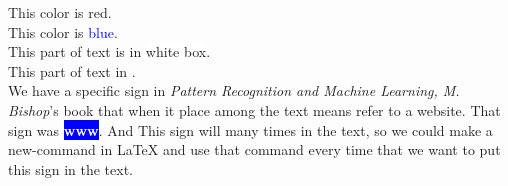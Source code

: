 \documentclass[12pt]{article}
\begin{document}
	
	\noindent
	This color is {\color{red} red}.\\
	
	\noindent
	This color is \textcolor{blue}{blue}.\\
	
	\noindent
	This part of text is in \colorbox{white}{white box}.\\
	
	\noindent
	This part of text in .\\
	
	\noindent
	We have a specific sign in \emph{Pattern Recognition and Machine Learning, M. Bishop}'s book that when it place among the text means refer to a website. That sign was
	\colorbox{blue}{\textcolor{white}{\textsf{\textbf{www}}}}. And This sign will many times in the text, so we could make a new-command in \LaTeX {} and use that command every time that we want to put this sign in the text.
	
	
\end{document}

